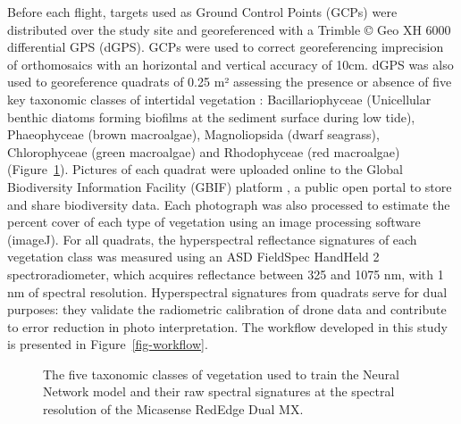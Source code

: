 \documentclass[
  number]{elsarticle}
\begin{document}
Before each flight, targets used as Ground Control Points (GCPs) were
distributed over the study site and georeferenced with a Trimble © Geo
XH 6000 differential GPS (dGPS). GCPs were used to correct
georeferencing imprecision of orthomosaics with an horizontal and
vertical accuracy of 10cm. dGPS was also used to georeference quadrats
of 0.25 m² assessing the presence or absence of five key taxonomic
classes of intertidal vegetation : Bacillariophyceae (Unicellular
benthic diatoms forming biofilms at the sediment surface during low
tide), Phaeophyceae (brown macroalgae), Magnoliopsida (dwarf seagrass),
Chlorophyceae (green macroalgae) and Rhodophyceae (red macroalgae)
(Figure~\ref{fig-vegetation}). Pictures of each quadrat were uploaded
online to the Global Biodiversity Information Facility (GBIF) platform
\citep{BedeGbif}, a public open portal to store and share biodiversity
data. Each photograph was also processed to estimate the percent cover
of each type of vegetation using an image processing software (imageJ).
For all quadrats, the hyperspectral reflectance signatures of each
vegetation class was measured using an ASD FieldSpec HandHeld 2
spectroradiometer, which acquires reflectance between 325 and 1075 nm,
with 1 nm of spectral resolution. Hyperspectral signatures from quadrats
serve for dual purposes: they validate the radiometric calibration of
drone data and contribute to error reduction in photo interpretation.
The workflow developed in this study is presented in
Figure~\ref{fig-workflow}.

\label{cell-fig-vegetation}
\begin{figure}[H]


\caption{\label{fig-vegetation}The five taxonomic classes of vegetation
used to train the Neural Network model and their raw spectral signatures
at the spectral resolution of the Micasense RedEdge Dual MX.}

\end{figure}%
\end{document}
